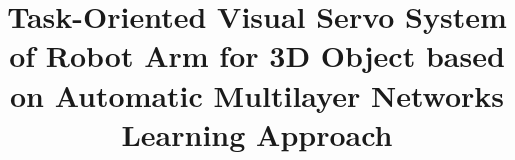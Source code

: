 \documentclass[journal]{IEEEtran}
\begin{document}
%
\title{Task-Oriented Visual Servo System of Robot Arm for 3D Object based on Automatic Multilayer Networks Learning Approach }




\author{


}



% 







\end{document}

